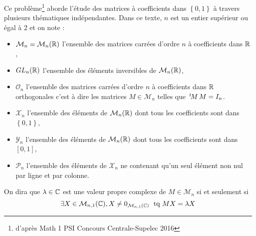 Ce problème\footnote{d'après Math 1 PSI Concours Centrale-Supelec 2016} aborde l'étude des matrices à coefficients dans $\left\lbrace 0,1\right\rbrace$ à travers plusieurs thématiques indépendantes. Dans ce texte, $n$ est un entier supérieur ou égal à $2$ et on note :
\begin{itemize}
  \item $\mathcal{M}_{n}=\mathcal{M}_{n}(\mathbb{R})$ l'ensemble des matrices carrées d'ordre $n$ à coefficients dans $\mathbb{R}$,
  \item $GL_n(\mathbb{R})$ l'ensemble des éléments inversibles de $\mathcal{M}_n(\mathbb{R})$,
  \item $\mathcal{O}_n$ l'ensemble des matrices carrées d'ordre $n$ à coefficients dans $\mathbb{R}$ orthogonales c'est à dire les matrices $M\in \mathcal{M}_n$ telles que $\,\mathstrut^t\! M\,M = I_n$.
  \item $\mathcal{X}_n$ l'ensemble des éléments de $\mathcal{M}_n(\mathbb{R})$ dont tous les coefficients sont dans $\left\lbrace 0,1\right\rbrace$, 
  \item $\mathcal{Y}_n$ l'ensemble des éléments de $\mathcal{M}_n(\mathbb{R})$ dont tous les coefficients sont dans $\left[  0,1 \right] $,
  \item $\mathcal{P}_n$ l'ensemble des éléments de $\mathcal{X}_n$ ne contenant qu'un seul élément non nul par ligne et par colonne.
\end{itemize}
On dira que $\lambda \in \mathbb{C}$ est une valeur propre complexe de $M\in \mathcal{M}_n$ si et seulement si
\begin{displaymath}
 \exists X\in \mathcal{M}_{n,1}(\mathbb{C}), X\neq 0_{\mathcal{M}_{n,1}(\mathbb{C})}\; \text{ tq } MX = \lambda X  
\end{displaymath}
